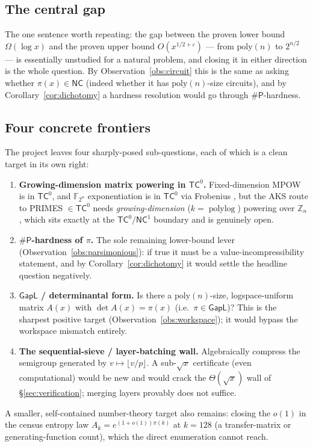 \documentclass[11pt]{article}
\theoremstyle{plain}
\theoremstyle{definition}
\theoremstyle{remark}
\DeclareMathOperator{\polylog}{polylog}
\newcommand{\eps}{\varepsilon}
\newcommand{\sharpP}{\#\mathsf{P}}
\newcommand{\NC}{\mathsf{NC}}
\newcommand{\TC}{\mathsf{TC}^{0}}
\newcommand{\GapL}{\mathsf{GapL}}
\begin{document}
\subsection{The central gap}

The one sentence worth repeating: the gap between the proven lower bound
$\Omega(\log x)$ and the proven upper bound $O(x^{1/2+\eps})$ --- from
$\mathrm{poly}(n)$ to $2^{n/2}$ --- is essentially unstudied for a natural problem,
and closing it in either direction is the whole question. By
Observation~\ref{obs:circuit} this is the same as asking whether $\pi(x)\in\NC$
(indeed whether it has $\mathrm{poly}(n)$-size circuits), and by
Corollary~\ref{cor:dichotomy} a hardness resolution would go through
$\sharpP$-hardness.

\subsection{Four concrete frontiers}

The project leaves four sharply-posed sub-questions, each of which is a clean
target in its own right:
\begin{enumerate}[leftmargin=1.7em,itemsep=3pt]
\item \textbf{Growing-dimension matrix powering in $\TC$.} Fixed-dimension MPOW is
in $\TC$, and $\mathbb{F}_{2^n}$ exponentiation is in $\TC$ via Frobenius
\cite{healyviola2006}, but the AKS route to PRIMES $\in\TC$ needs
\emph{growing-dimension} ($k=\polylog$) powering over $\mathbb{Z}_n$, which sits
exactly at the $\TC/\mathsf{NC}^1$ boundary and is genuinely open.
\item \textbf{$\sharpP$-hardness of $\pi$.} The sole remaining lower-bound lever
(Observation~\ref{obs:parsimonious}): if true it must be a value-incompressibility
statement, and by Corollary~\ref{cor:dichotomy} it would settle the headline
question negatively.
\item \textbf{$\GapL$ / determinantal form.} Is there a $\mathrm{poly}(n)$-size,
logspace-uniform matrix $A(x)$ with $\det A(x)=\pi(x)$ (i.e.\ $\pi\in\GapL$)? This
is the sharpest positive target (Observation~\ref{obs:workspace}); it would bypass
the workspace mismatch entirely.
\item \textbf{The sequential-sieve / layer-batching wall.} Algebraically compress
the semigroup generated by $v\mapsto\lfloor v/p\rfloor$. A sub-$\sqrt{x}$
certificate (even computational) would be new and would crack the
$\Theta(\sqrt{x})$ wall of \S\ref{sec:verification}; merging layers provably does
not suffice.
\end{enumerate}
A smaller, self-contained number-theory target also remains: closing the $o(1)$ in
the census entropy law $A_k=e^{(1+o(1))\pi(k)}$ at $k=128$ (a transfer-matrix or
generating-function count), which the direct enumeration cannot reach.
\end{document}
